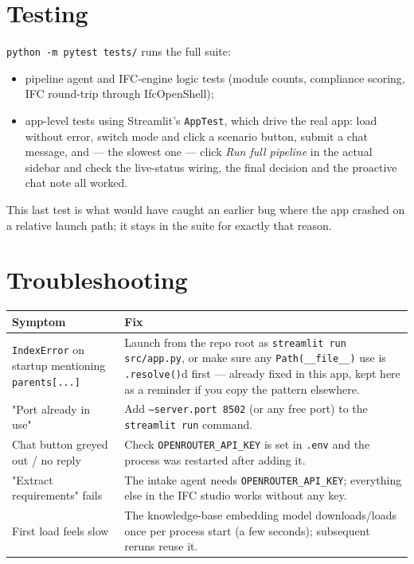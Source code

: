 \documentclass[11pt]{article}
\begin{document}
\section{Testing}
\texttt{python -m pytest tests/} runs the full suite:
\begin{itemize}[nosep]
\item pipeline agent and IFC-engine logic tests (module counts, compliance scoring, IFC round-trip through IfcOpenShell);
\item app-level tests using Streamlit's \texttt{AppTest}, which drive the real app: load without error, switch
mode and click a scenario button, submit a chat message, and — the slowest one — click \emph{Run full pipeline}
in the actual sidebar and check the live-status wiring, the final decision and the proactive chat note all worked.
\end{itemize}
This last test is what would have caught an earlier bug where the app crashed on a relative launch path; it stays
in the suite for exactly that reason.

\section{Troubleshooting}
\begin{table}[H]\centering\small
\begin{tabular}{@{}p{5.2cm}p{7.5cm}@{}}\toprule
Symptom & Fix \\ \midrule
\texttt{IndexError} on startup mentioning \texttt{parents[...]} & Launch from the repo root as \texttt{streamlit run src/app.py}, or make sure any \texttt{Path(\_\_file\_\_)} use is \texttt{.resolve()}d first — already fixed in this app, kept here as a reminder if you copy the pattern elsewhere. \\
"Port already in use" & Add \texttt{--server.port 8502} (or any free port) to the \texttt{streamlit run} command. \\
Chat button greyed out / no reply & Check \texttt{OPENROUTER\_API\_KEY} is set in \texttt{.env} and the process was restarted after adding it. \\
"Extract requirements" fails & The intake agent needs \texttt{OPENROUTER\_API\_KEY}; everything else in the IFC studio works without any key. \\
First load feels slow & The knowledge-base embedding model downloads/loads once per process start (a few seconds); subsequent reruns reuse it. \\ \bottomrule
\end{tabular}\end{table}
\end{document}
